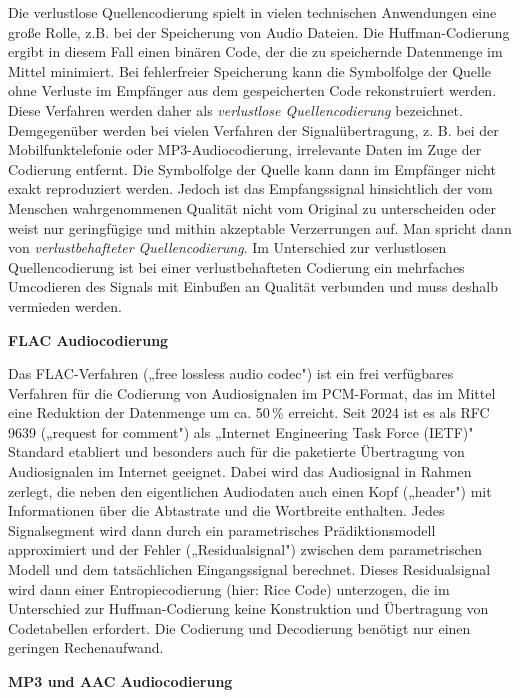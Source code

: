 Die verlustlose Quellencodierung spielt in vielen technischen Anwendungen eine große Rolle, z.B. bei der Speicherung von Audio Dateien. Die Huffman-Codierung ergibt in diesem Fall einen binären Code, der die zu speichernde Datenmenge im Mittel minimiert. Bei fehlerfreier Speicherung kann die Symbolfolge der Quelle ohne Verluste im Empfänger aus dem gespeicherten Code rekonstruiert werden. Diese Verfahren werden daher als \textit{verlustlose Quellencodierung} bezeichnet. Demgegenüber werden bei vielen Verfahren der Signalübertragung, z. B. bei der Mobilfunktelefonie oder MP3-Audiocodierung, irrelevante Daten im Zuge der Codierung entfernt. Die Symbolfolge der Quelle kann dann im Empfänger nicht exakt reproduziert werden. Jedoch ist das Empfangssignal hinsichtlich der vom Menschen wahrgenommenen Qualität nicht vom Original zu unterscheiden oder weist nur geringfügige und mithin akzeptable Verzerrungen auf. Man spricht dann von \textit{verlustbehafteter Quellencodierung}. Im Unterschied zur verlustlosen Quellencodierung ist bei einer verlustbehafteten Codierung ein mehrfaches Umcodieren des Signals mit Einbußen an Qualität verbunden und muss deshalb vermieden werden.

\textbf{FLAC Audiocodierung}

Das FLAC-Verfahren („free lossless audio codec") ist ein frei verfügbares Verfahren für die Codierung von Audiosignalen im PCM-Format, das im Mittel eine Reduktion der Datenmenge um ca. 50\,\% erreicht. Seit 2024 ist es als RFC 9639 („request for comment") als „Internet Engineering Task Force (IETF)" Standard etabliert und besonders auch für die paketierte Übertragung von Audiosignalen im Internet geeignet. Dabei wird das Audiosignal in Rahmen zerlegt, die neben den eigentlichen Audiodaten auch einen Kopf („header") mit Informationen über die Abtastrate und die Wortbreite enthalten. Jedes Signalsegment wird dann durch ein parametrisches Prädiktionsmodell approximiert und der Fehler („Residualsignal") zwischen dem parametrischen Modell und dem tatsächlichen Eingangssignal berechnet. Dieses Residualsignal wird dann einer Entropiecodierung (hier: Rice Code) unterzogen, die im Unterschied zur Huffman-Codierung keine Konstruktion und Übertragung von Codetabellen erfordert. Die Codierung und Decodierung benötigt nur einen geringen Rechenaufwand.

\textbf{MP3 und AAC Audiocodierung}

